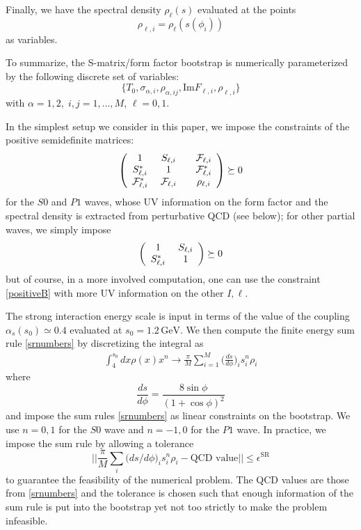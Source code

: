 \documentclass[12pt,letterpaper]{article}
\newcommand{\beqa}{\begin{eqnarray}}
\newcommand{\eeqa}{\end{eqnarray}}
\newcommand{\cF}{{\cal F}}
\newcommand{\GeV}{\ensuremath{\mbox{GeV}}}
\begin{document}
Finally, we have the spectral density $\rho_\ell(s)$ evaluated at the points
\begin{equation}\label{h39}
\rho_{\ell,i}=\rho_{\ell}(s(\phi_i))
\end{equation}
as variables.

To summarize, the S-matrix/form factor bootstrap is numerically parameterized by the following discrete set of variables:
\begin{equation}\label{h40}
\{T_0,\sigma_{\alpha,i},\rho_{\alpha,ij}, \text{Im}F_{\ell,i},\rho_{\ell,i}\}
\end{equation}
with $\alpha=1,2,\; i,j=1,\ldots,M$, $\ell=0,1$.

In the simplest setup we consider in this paper, we impose the constraints of the positive semidefinite matrices:
\begin{equation}\label{positiveB}
\left(
\begin{array}{c c c}
1 &\ S_{\ell,i}\ &\ \ \cF_{\ell,i} \\
S^*_{\ell,i} &\ 1\ & \ \ \cF^*_{\ell,i}\\
\cF^*_{\ell,i} &\ \cF_{\ell,i}\ &\ \ \rho_{\ell,i}
\end{array}
\right) \succeq 0
\end{equation}
for the $S0$ and $P1$ waves, whose UV information on the form factor and the spectral density is extracted from perturbative QCD (see below); for other partial waves, we simply impose
\begin{equation}\label{h41}
\left(
\begin{array}{c c c}
1 &\ S_{\ell,i}\\
S^*_{\ell,i} &\ 1
\end{array}
\right)\succeq 0
\end{equation}
but of course, in a more involved computation, one can use the constraint \eqref{positiveB} with more UV information on the other $I,\ell$.
\medskip

The strong interaction energy scale is input in terms of the value of the coupling $\alpha_s(s_0)\simeq0.4$ evaluated at $s_0=1.2\,\GeV$. We then compute the finite energy sum rule \eqref{srnumbers} by discretizing the integral as
\beqa\label{srnum}
\int_4^{s_0}dx \rho(x)x^n \rightarrow \frac{\pi}{M}\sum_{i=1}^M\bigg(\frac{ds}{d\phi}\bigg)_i s_i^n\rho_{i}
\eeqa  
where
\begin{equation}\label{h42}
\frac{ds}{d\phi}=\frac{8\sin \phi}{(1+\cos\phi)^2}
\end{equation}
and impose the sum rules \eqref{srnumbers} as linear constraints on the bootstrap. We use $n=0,1$ for the $S0$ wave and $n=-1,0$ for the $P1$ wave.
In practice, we impose the sum rule by allowing a tolerance
\begin{equation}\label{h43}
||\frac{\pi}{M}\sum_{i}\big(ds/d\phi\big)_i s_i^n\rho_{i}-\text{QCD value}||\le \epsilon^{\text{SR}}
\end{equation}
to guarantee the feasibility of the numerical problem. The QCD values are those from  \eqref{srnumbers} and the tolerance is chosen such that enough information of the sum rule is put into the bootstrap yet not too strictly to make the problem infeasible.
\end{document}
